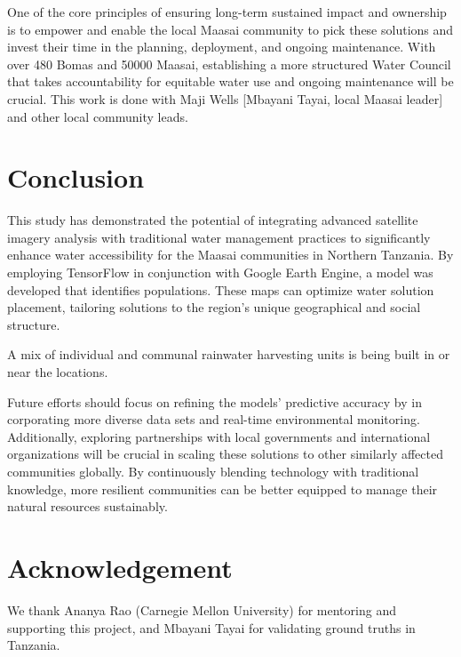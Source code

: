 \documentclass[10pt]{article}
\begin{document}
One of the core principles of ensuring long-term sustained impact and ownership is to empower and enable the local Maasai community to pick these solutions and invest their time in the planning, deployment, and ongoing maintenance. With over 480 Bomas and 50000 Maasai, establishing a more structured Water Council that takes accountability for equitable water use and ongoing maintenance will be crucial. This work is done with Maji Wells [Mbayani Tayai, local Maasai leader] and other local community leads.








\section{Conclusion}

This study has demonstrated the potential of integrating advanced satellite imagery analysis with traditional water management practices to significantly enhance water accessibility for the Maasai communities in Northern Tanzania. By employing TensorFlow in conjunction with Google Earth Engine, a model was developed that identifies populations. These maps can optimize water solution placement, tailoring solutions to the region's unique geographical and social structure.

A mix of individual and communal rainwater harvesting units is being built in or near the locations.

Future efforts should focus on refining the models' predictive accuracy by in corporating more diverse data sets and real-time environmental monitoring. Additionally, exploring partnerships with local governments and international organizations will be crucial in scaling these solutions to other similarly affected communities globally. By continuously blending technology with traditional knowledge, more resilient communities can be better equipped to manage their natural resources sustainably.

\section*{Acknowledgement}

We thank Ananya Rao (Carnegie Mellon University) for mentoring and supporting this project, and Mbayani Tayai for validating ground truths in Tanzania.

\printbibliography
\end{document}
